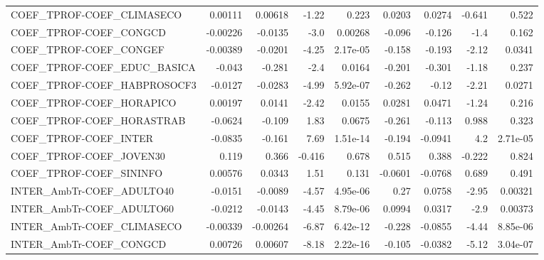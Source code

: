 \begin{tabular}{lrrrrrrrr}
COEF\_TPROF-COEF\_CLIMASECO         &     0.00111 &      0.00618 &   -1.22 &    0.223 &     0.0203 &      0.0274 &       -0.641 &         0.522 \\
COEF\_TPROF-COEF\_CONGCD            &    -0.00226 &      -0.0135 &    -3.0 &  0.00268 &     -0.096 &      -0.126 &         -1.4 &         0.162 \\
COEF\_TPROF-COEF\_CONGEF            &    -0.00389 &      -0.0201 &   -4.25 & 2.17e-05 &     -0.158 &      -0.193 &        -2.12 &        0.0341 \\
COEF\_TPROF-COEF\_EDUC\_BASICA       &      -0.043 &       -0.281 &    -2.4 &   0.0164 &     -0.201 &      -0.301 &        -1.18 &         0.237 \\
COEF\_TPROF-COEF\_HABPROSOCF3       &     -0.0127 &      -0.0283 &   -4.99 & 5.92e-07 &     -0.262 &       -0.12 &        -2.21 &        0.0271 \\
COEF\_TPROF-COEF\_HORAPICO          &     0.00197 &       0.0141 &   -2.42 &   0.0155 &     0.0281 &      0.0471 &        -1.24 &         0.216 \\
COEF\_TPROF-COEF\_HORASTRAB         &     -0.0624 &       -0.109 &    1.83 &   0.0675 &     -0.261 &      -0.113 &        0.988 &         0.323 \\
COEF\_TPROF-COEF\_INTER             &     -0.0835 &       -0.161 &    7.69 & 1.51e-14 &     -0.194 &     -0.0941 &          4.2 &      2.71e-05 \\
COEF\_TPROF-COEF\_JOVEN30           &       0.119 &        0.366 &  -0.416 &    0.678 &      0.515 &       0.388 &       -0.222 &         0.824 \\
COEF\_TPROF-COEF\_SININFO           &     0.00576 &       0.0343 &    1.51 &    0.131 &    -0.0601 &     -0.0768 &        0.689 &         0.491 \\
INTER\_AmbTr-COEF\_ADULTO40         &     -0.0151 &      -0.0089 &   -4.57 & 4.95e-06 &       0.27 &      0.0758 &        -2.95 &       0.00321 \\
INTER\_AmbTr-COEF\_ADULTO60         &     -0.0212 &      -0.0143 &   -4.45 & 8.79e-06 &     0.0994 &      0.0317 &         -2.9 &       0.00373 \\
INTER\_AmbTr-COEF\_CLIMASECO        &    -0.00339 &     -0.00264 &   -6.87 & 6.42e-12 &     -0.228 &     -0.0855 &        -4.44 &      8.85e-06 \\
INTER\_AmbTr-COEF\_CONGCD           &     0.00726 &      0.00607 &   -8.18 & 2.22e-16 &     -0.105 &     -0.0382 &        -5.12 &      3.04e-07 \\

\end{tabular}
